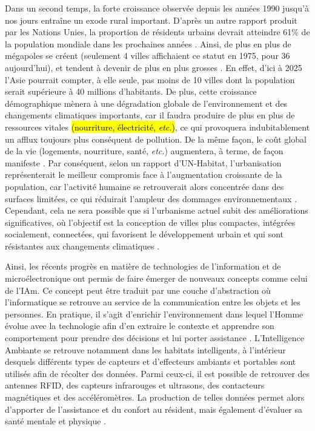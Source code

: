 Dans un second temps, la forte croissance observée depuis les années 1990 jusqu'à nos jours entraîne un exode rural important. D'après un autre rapport produit par les Nations Unies, la proportion de résidents urbains devrait atteindre 61\% de la population mondiale dans les prochaines années \citep{UnitedNations2017a}. Ainsi, de plus en plus de mégapoles se créent (seulement 4 villes affichaient ce statut en 1975, pour 36 aujourd'hui), et tendent à devenir de plus en plus grosses \citep{UnitedNations2017a}. En effet, d'ici à 2025 l'Asie pourrait compter, à elle seule, pas moins de 10 villes dont la population serait supérieure à 40 millions d'habitants. De plus, cette croissance démographique mènera à une dégradation globale de l'environnement et des changements climatiques importants, car il faudra produire de plus en plus de ressources vitales \hl{(nourriture, électricité, \textit{etc.})}, ce qui provoquera indubitablement un afflux toujours plus conséquent de pollution. De la même façon, le coût global de la vie (logements, nourriture, santé, \textit{etc.}) augmentera, à terme, de façon manifeste \citep{UnitedNations2017a}. Par conséquent, selon un rapport d'UN-Habitat, l'urbanisation représenterait le meilleur compromis face à l'augmentation croissante de la population, car l'activité humaine se retrouverait alors concentrée dans des surfaces limitées, ce qui réduirait l'ampleur des dommages environnementaux \citep{UNFPA2007}. Cependant, cela ne sera possible que si l'urbanisme actuel subit des améliorations significatives, où l'objectif est la conception de villes plus compactes, intégrées socialement, connectées, qui favorisent le développement urbain et qui sont résistantes aux changements climatiques \citep{UNFPA2007}.

Ainsi, les récents progrès en matière de technologies de l'information et de microélectronique ont permis de faire émerger de nouveaux concepts comme celui de l'\ac{IAm}. Ce concept peut être traduit par une couche d'abstraction où l'informatique se retrouve au service de la communication entre les objets et les personnes. En pratique, il s'agit d'enrichir l'environnement dans lequel l'Homme évolue avec la technologie afin d'en extraire le contexte et apprendre son comportement pour prendre des décisions et lui porter assistance \citep{Sadri2011}. L'Intelligence Ambiante se retrouve notamment dans les habitats intelligents, à l'intérieur desquels différents types de capteurs et d'effecteurs ambiants et portables sont utilisés afin de récolter des données. Parmi ceux-ci, il est possible de retrouver des antennes RFID, des capteurs infrarouges et ultrasons, des contacteurs magnétiques et des accéléromètres. La production de telles données permet alors d'apporter de l'assistance et du confort au résident, mais également d'évaluer sa santé mentale et physique \citep{Rashidi2013, Haux2016, Harris2016, Johnson2018}.

